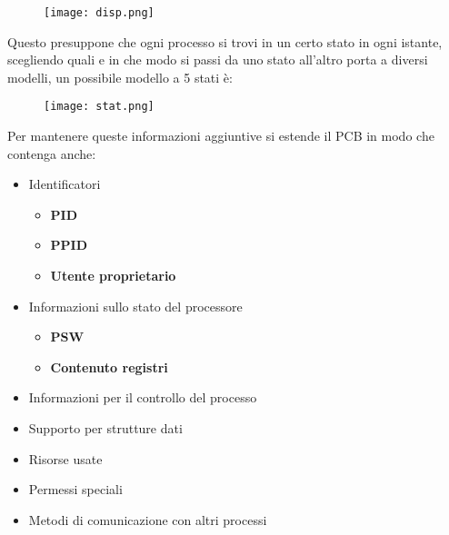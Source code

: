\documentclass{article}
\begin{document}
\begin{figure}[ht]
    \centering
    \texttt{[image: disp.png]}
    \label{fig:disp}
\end{figure}

\noindent Questo presuppone che ogni processo si trovi in un certo stato in ogni istante, scegliendo quali e in che modo si passi da uno stato all'altro porta a diversi modelli, un possibile modello a 5 stati è:\newline

\begin{figure}[ht]
    \centering
    \texttt{[image: stat.png]}
    \label{fig:stat}
\end{figure}

\newpage

\noindent Per mantenere queste informazioni aggiuntive si estende il PCB in modo che contenga anche:
\begin{itemize}
    \item Identificatori
        \begin{itemize}
            \item \textbf{PID}
            \item \textbf{PPID}
            \item \textbf{Utente proprietario}
        \end{itemize}

    \item Informazioni sullo stato del processore
        \begin{itemize}
            \item \textbf{PSW}
            \item \textbf{Contenuto registri}
        \end{itemize}

    \item Informazioni per il controllo del processo

    \item Supporto per strutture dati

    \item Risorse usate

    \item Permessi speciali

    \item Metodi di comunicazione con altri processi\newline
        
\end{itemize}
\end{document}
